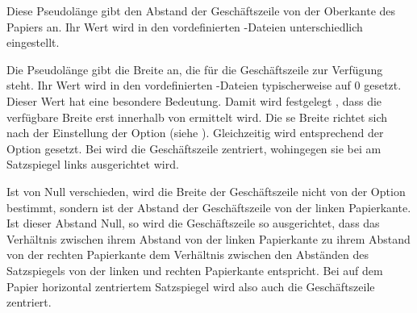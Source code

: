 \begin{Declaration}
\end{Declaration}
Diese Pseudolänge gibt den Abstand der Geschäftszeile von der Oberkante des
Papiers an. Ihr Wert wird in den vordefinierten
-Dateien
unterschiedlich eingestellt. %
%
\EndIndexGroup


\begin{Declaration}
\end{Declaration}
Die Pseudolänge  gibt die Breite an, die für die
Geschäftszeile zur Verfügung steht. Ihr Wert wird in den vordefinierten
-Dateien typischerweise auf 0
gesetzt. Dieser Wert hat eine besondere Bedeutung. %
\iffalse%
Es wird damit keineswegs festgelegt, dass für die Geschäftszeile keine Breite
zur Verfügung steht. Vielmehr bedeutet der Wert%
\else%
Damit wird festgelegt%
\fi%
, dass die verfügbare Breite erst innerhalb von
 ermittelt wird.  Die%
\iffalse%
\ dort ermittelte %
\else%
se %
\fi%
Breite richtet sich nach der Einstellung der Option
%
 (siehe
). Gleichzeitig wird
 entsprechend der Option gesetzt. Bei
%
 wird die Geschäftszeile zentriert,
wohingegen sie bei %
 am Satzspiegel links ausgerichtet
wird.

Ist  von Null verschieden, wird die Breite der
Geschäftszeile nicht von der Option 
bestimmt, sondern  ist der Abstand der Geschäftszeile von der
linken Papierkante. Ist dieser Abstand Null, so wird die
Geschäftszeile so ausgerichtet, dass das Verhältnis zwischen ihrem Abstand von
der linken Papierkante zu ihrem Abstand von der rechten Papierkante dem
Verhältnis zwischen den Abständen des Satzspiegels von der linken und rechten
Papierkante entspricht. Bei auf dem Papier horizontal zentriertem Satzspiegel
wird also auch die Geschäftszeile zentriert.

